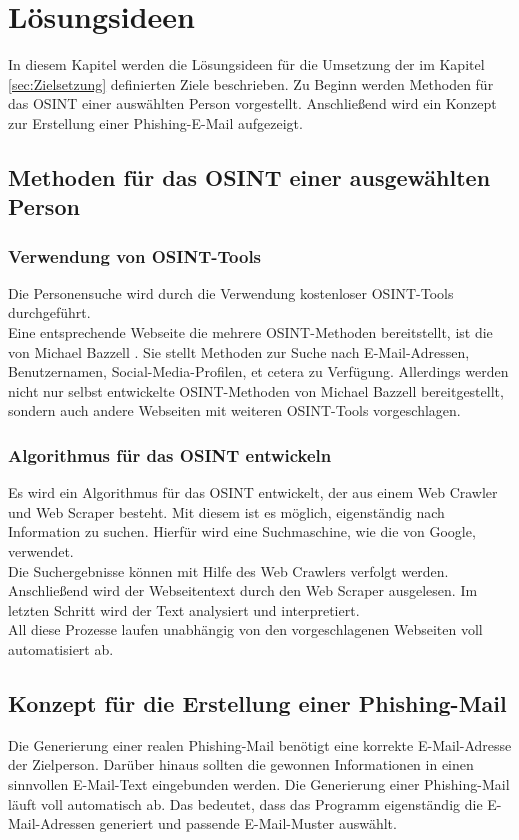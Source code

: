 
\chapter{Lösungsideen}  %
\label{cha:Lösungsideen} %
In diesem Kapitel werden die Lösungsideen für die Umsetzung der im Kapitel \ref{sec:Zielsetzung} definierten Ziele beschrieben. Zu Beginn werden Methoden für das OSINT einer auswählten Person vorgestellt. Anschließend wird ein Konzept zur Erstellung einer Phishing-E-Mail aufgezeigt.

\section{Methoden für das OSINT einer ausgewählten Person}
	\subsection{Verwendung von OSINT-Tools}
	Die Personensuche wird durch die Verwendung kostenloser OSINT-Tools durchgeführt.\\ 
	Eine entsprechende Webseite die mehrere OSINT-Methoden bereitstellt, ist die von Michael Bazzell \cite{intelTechniques}. Sie stellt Methoden zur Suche nach E-Mail-Adressen, Benutzernamen, Social-Media-Profilen, et cetera zu Verfügung. Allerdings werden nicht nur selbst entwickelte OSINT-Methoden von Michael Bazzell bereitgestellt, sondern auch andere Webseiten mit weiteren OSINT-Tools vorgeschlagen.
	
	\subsection{Algorithmus für das OSINT entwickeln}
	Es wird ein Algorithmus für das OSINT entwickelt, der aus einem Web Crawler und Web Scraper besteht. Mit diesem ist es möglich, eigenständig nach Information zu suchen. Hierfür wird eine Suchmaschine, wie die von Google, verwendet.\\
	Die Suchergebnisse können mit Hilfe des Web Crawlers verfolgt werden. Anschließend wird der Webseitentext durch den Web Scraper ausgelesen. Im letzten Schritt wird der Text analysiert und interpretiert.\\
	All diese Prozesse laufen unabhängig von den vorgeschlagenen Webseiten voll automatisiert ab.

	
\section{Konzept für die Erstellung einer Phishing-Mail}
Die Generierung einer realen Phishing-Mail benötigt eine korrekte E-Mail-Adresse der Zielperson. Darüber hinaus sollten die gewonnen Informationen in einen sinnvollen E-Mail-Text eingebunden werden. Die Generierung einer Phishing-Mail läuft voll automatisch ab. Das bedeutet, dass das Programm eigenständig die E-Mail-Adressen generiert und passende E-Mail-Muster auswählt.
	
